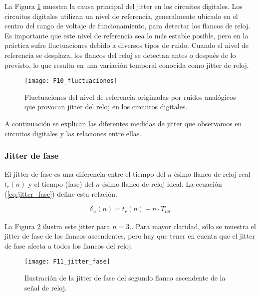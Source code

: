             La Figura \ref{fig:F10_fluctuaciones} muestra la causa principal del jitter en los circuitos digitales. Los circuitos digitales utilizan un nivel de referencia, generalmente ubicado en el centro del rango de voltaje de funcionamiento, para detectar los flancos de reloj. Es importante que este nivel de referencia sea lo más estable posible, pero en la práctica sufre fluctuaciones debido a diversos tipos de ruido. Cuando el nivel de referencia se desplaza, los flancos del reloj se detectan antes o después de lo previsto, lo que resulta en una variación temporal conocida como jitter de reloj.

            \begin{figure}[hbtp]
                \caption{Fluctuaciones del nivel de referencia originadas por ruidos analógicos que provocan jitter del reloj en los circuitos digitales. \cite{Petura2019}}
                \centering
                \texttt{[image: F10\_fluctuaciones]}
                \label{fig:F10_fluctuaciones}
            \end{figure}
        
            A continuación se explican las diferentes medidas de jitter que observamos en circuitos digitales y las relaciones entre ellas.

            \subsubsection{Jitter de fase}

                El jitter de fase es una diferencia entre el tiempo del $n$-ésimo flanco de reloj real $t_{r}(n)$ y el tiempo (fase) del $n$-ésimo flanco de reloj ideal. La ecuación (\ref{eq:jitter_fase}) define esta relación.

                \begin{equation}
                    \delta_{\varphi}(n) = t_{r}(n) - n \cdot T_{\text{ref}}
                    \label{eq:jitter_fase}
                \end{equation}
                
                La Figura \ref{fig:F11_jitter_fase} ilustra este jitter para $n = 3.$. Para mayor claridad, sólo se muestra el jitter de fase de los flancos ascendentes, pero hay que tener en cuenta que el jitter de fase afecta a todos los flancos del reloj.

                \begin{figure}[hbtp]
                    \caption{Ilustración de la jitter de fase del segundo flanco ascendente de la señal de reloj. \cite{Petura2019}}
                    \centering
                    \texttt{[image: F11\_jitter\_fase]}
                    \label{fig:F11_jitter_fase}
                \end{figure}

